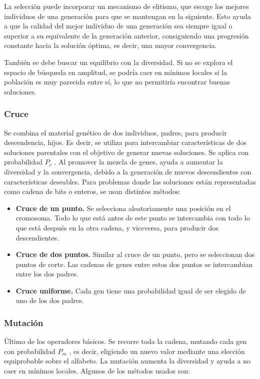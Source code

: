 La selección puede incorporar un mecanismo de elitismo, que escoge los mejores individuos de una generación para que se mantengan en la siguiente. Esto ayuda a que la calidad del mejor individuo de una generación sea siempre igual o superior a su equivalente de la generación anterior, consiguiendo una progresión constante hacia la solución óptima, es decir, una mayor convergencia.

También se debe buscar un equilibrio con la diversidad. Si no se explora el espacio de búsqueda en amplitud, se podría caer en mínimos locales si la población es muy parecida entre sí, lo que no permitiría encontrar buenas soluciones.


\subsubsection{Cruce}

Se combina el material genético de dos individuos, padres, para producir descendencia, hijos. Es decir, se utiliza para intercambiar características de dos soluciones parentales con el objetivo de generar nuevas soluciones. Se aplica con probabilidad \(P_c\) . Al promover la mezcla de genes, ayuda a aumentar la diversidad y la convergencia, debido a la generación de nuevos descendientes con características deseables. Para problemas donde las soluciones están representadas como cadena de bits o enteros, se usan distintos métodos:

\begin{itemize}
  \item \textbf{Cruce de un punto.} Se selecciona aleatoriamente una posición en el cromosoma. Todo lo que está antes de este punto se intercambia con todo lo que está después en la otra cadena, y viceversa, para producir dos descendientes.
  \item \textbf{Cruce de dos puntos.} Similar al cruce de un punto, pero se seleccionan dos puntos de corte. Las cadenas de genes entre estos dos puntos se intercambian entre los dos padres.
  \item \textbf{Cruce uniforme.} Cada gen tiene una probabilidad igual de ser elegido de uno de los dos padres.
\end{itemize}

\subsubsection{Mutación}

Último de los operadores básicos. Se recorre toda la cadena, mutando cada gen con probabilidad \(P_m\) , es decir, eligiendo un nuevo valor mediante una elección equiprobable sobre el alfabeto. La mutación aumenta la diversidad y ayuda a no caer en mínimos locales. Algunos de los métodos usados son:


